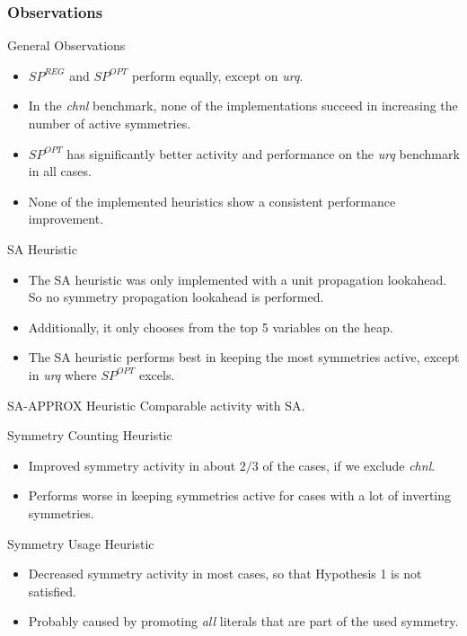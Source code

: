 \documentclass{beamer}
\begin{document}
	\begin{frame}[allowframebreaks]
		\frametitle{Observations}
		\begin{block}{General Observations}
			\begin{itemize}
				\item $SP^{REG}$ and $SP^{OPT}$ perform equally, except on \emph{urq}.
				\item In the \emph{chnl} benchmark, none of the implementations succeed in increasing the number of active symmetries.
				\item $SP^{OPT}$ has significantly better activity and performance on the \emph{urq} benchmark in all cases.
				\item None of the implemented heuristics show a consistent performance improvement.
			\end{itemize}
		\end{block}

		\begin{block}{SA Heuristic}
			\begin{itemize}
				\item The SA heuristic was only implemented with a unit propagation lookahead.
					So no symmetry propagation lookahead is performed.
				\item Additionally, it only chooses from the top 5 variables on the heap.
				\item The SA heuristic performs best in keeping the most symmetries active, except in \emph{urq} where $SP^{OPT}$ excels.
			\end{itemize}
		\end{block}

		\begin{block}{SA-APPROX Heuristic}
			Comparable activity with SA.
		\end{block}

		\begin{block}{Symmetry Counting Heuristic}
			\begin{itemize}
				\item Improved symmetry activity in about $2/3$ of the cases, if we exclude \emph{chnl}.
				\item Performs worse in keeping symmetries active for cases with a lot of inverting symmetries.
			\end{itemize}
		\end{block}

		\begin{block}{Symmetry Usage Heuristic}
			\begin{itemize}
				\item Decreased symmetry activity in most cases, so that Hypothesis 1 is not satisfied.
				\item Probably caused by promoting \emph{all} literals that are part of the used symmetry.
			\end{itemize}
		\end{block}
	\end{frame}
\end{document}
